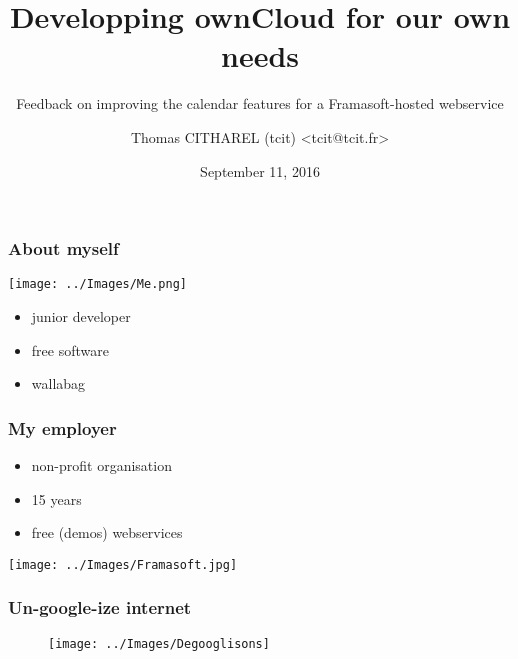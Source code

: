 \documentclass[11pt]{beamer}
\author{Thomas CITHAREL (tcit) \textless tcit@tcit.fr\textgreater}
\title{Developping ownCloud for our own needs}
\subtitle{Feedback on improving the calendar features for a Framasoft-hosted webservice}
\date{September 11, 2016}
\begin{document}
	\maketitle
	
	\begin{frame}
		\frametitle{About myself}
		\begin{minipage}{0.45\textwidth}
			\begin{flushleft}
			\begin{center}
				\texttt{[image: ../Images/Me.png]}
			\end{center}
			\label{publication-calendrier}
		\end{flushleft}
		\end{minipage}
		\begin{minipage}{0.45\textwidth}
			\begin{flushright}
				\begin{itemize}
					\item junior developer
					\item free software
					\item wallabag
				\end{itemize}
			\end{flushright}
		\end{minipage}
	\end{frame}
	\begin{frame}
		\frametitle{My employer}
		\begin{minipage}{0.45\textwidth}
			\begin{flushleft}
		\begin{itemize}
			\item non-profit organisation
			\item 15 years
			\item free (demos) webservices
		\end{itemize}
	\end{flushleft}
\end{minipage}
\begin{minipage}{0.45\textwidth}
	\begin{flushright}
		\begin{center}
			\texttt{[image: ../Images/Framasoft.jpg]}
		\end{center}
	\end{flushright}
\end{minipage}
	\end{frame}
	\begin{frame}
		\frametitle{Un-google-ize internet}
		\begin{figure}
\centering
\texttt{[image: ../Images/Degooglisons]}
\caption{}
\label{fig:Framasoft}
\end{figure}

	\end{frame}
\end{document}
